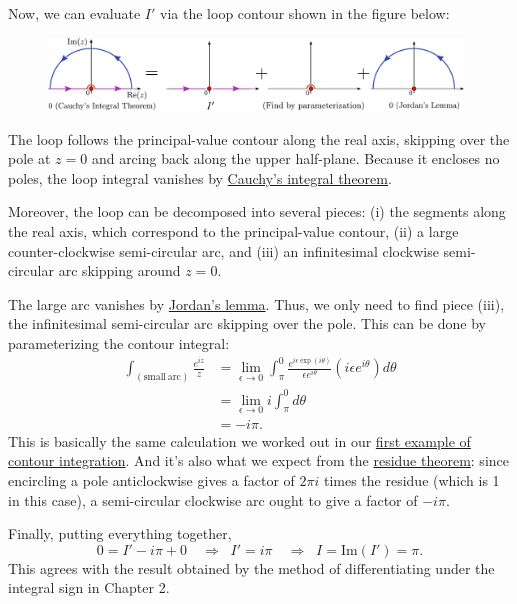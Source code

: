 \documentclass[10pt,a4paper]{article}
\begin{document}
Now, we can evaluate $I'$ via the loop contour shown in the figure
below:

\begin{figure}[h]
  \centering\includegraphics[width=0.98\textwidth]{contour_example4}
\end{figure}

\noindent
The loop follows the principal-value contour along the real axis,
skipping over the pole at $z = 0$ and arcing back along the upper
half-plane. Because it encloses no poles, the loop integral vanishes
by \hyperref[cauchys_theorem]{Cauchy's integral theorem}.

Moreover, the loop can be decomposed into several pieces: (i) the
segments along the real axis, which correspond to the principal-value
contour, (ii) a large counter-clockwise semi-circular arc, and (iii)
an infinitesimal clockwise semi-circular arc skipping around $z = 0$.

The large arc vanishes by \protect\hyperlink{jordans_lemma}{Jordan's
  lemma}. Thus, we only need to find piece (iii), the infinitesimal
semi-circular arc skipping over the pole. This can be done by
parameterizing the contour integral:
\begin{align}
  \int_{(\mathrm{small}\,\mathrm{arc})} \frac{e^{iz}}{z}
  &= \lim_{\epsilon \rightarrow 0} \int_{\pi}^{0}
  \frac{e^{i\epsilon \exp(i\theta)}}{\epsilon e^{i\theta}}
  \left(i\epsilon e^{i\theta}\right) d\theta \\
  &= \lim_{\epsilon \rightarrow 0} i \int_{\pi}^0 d\theta \\
  &= - i\pi.
\end{align}
This is basically the same calculation we worked out in our
\hyperref[arc_contour]{first example of contour integration}. And it's
also what we expect from the \hyperref[residue_theorem]{residue
  theorem}: since encircling a pole anticlockwise gives a factor of
$2\pi i$ times the residue (which is 1 in this case), a semi-circular
clockwise arc ought to give a factor of $- i \pi$.

Finally, putting everything together,
\begin{equation}
  0 = I' - i \pi + 0 \quad \Rightarrow \;\; I' = i \pi \quad\Rightarrow \;\; I = \mathrm{Im}(I') = \pi.
\end{equation}
This agrees with the result obtained by the method of differentiating
under the integral sign in Chapter 2.
\end{document}
